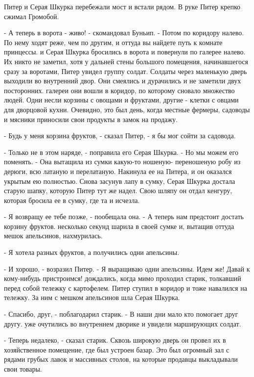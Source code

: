 Питер и Серая Шкурка перебежали мост и встали рядом. В руке Питер 
крепко сжимал Громобой.
\par- А теперь в ворота - живо! - скомандовал Буньип. - Потом по 
коридору налево. По нему ходят реже, чем по другим, и оттуда вы 
найдете путь к комнате принцессы.
 и Серая Шкурка бросились в ворота и повернули по галерее 
налево. Их никто не заметил, хотя у дальней стены большого помещения, 
начинавшегося сразу за воротами, Питер увидел группу солдат. Солдаты 
через маленькую дверь выходили во внутренний двор. Они смеялись и 
дурачились и не заметили двух посторонних.
 галереи они вошли в коридор, по которому сновало множество 
людей. Одни несли корзины с овощами и фруктами, другие - клетки с 
овцами для дворцовой кухни. Очевидно, это был день, когда местные 
фермеры, садоводы и мясники приносили свои продукты в замок на 
продажу.
\par- Будь у меня корзина фруктов, - сказал Питер, - я бы мог сойти за 
садовода.
\par- Только не в этом наряде, - поправила его Серая Шкурка. - Но мы 
можем его поменять. - Она вытащила из сумки какую-то ношеную-
переношеную робу из дерюги, всю латаную и перелатаную. Накинула ее на 
Питера, и он оказался укрытым ею полностью. Снова засунув лапу в 
сумку, Серая Шкурка достала старую шапку, которую Питер тут же надел. 
Свою шляпу он отдал кенгуру, которая бросила ее в сумку, где та и 
исчезла.
\par- Я возвращу ее тебе позже, - пообещала она. - А теперь нам 
предстоит достать корзину фруктов.
 несколько секунд шарила в своей сумке и, вытащив оттуда мешок 
апельсинов, нахмурилась.
\par- Я хотела разных фруктов, а получились одни апельсины.
\par- И хорошо, - возразил Питер. - Я выращиваю одни апельсины. Идем 
же! Давай к кому-нибудь пристроимся!
 дождались, когда мимо проходил старик, толкавший перед собой 
тележку с картофелем. Питер ступил в коридор и тоже навалился на 
тележку. За ним с мешком апельсинов шла Серая Шкурка.
\par- Спасибо, друг, - поблагодарил старик. - В наши дни мало кто 
помогает друг другу.
 уже очутились во внутреннем дворике и увидели марширующих 
солдат.
\par- Теперь недалеко, - сказал старик. Сквозь широкую дверь он провел 
их в хозяйственное помещение, где был устроен базар. Это был огромный 
зал с рядами грубых лавок и массивных столов, на которые продавцы 
выкладывали свои товары.
